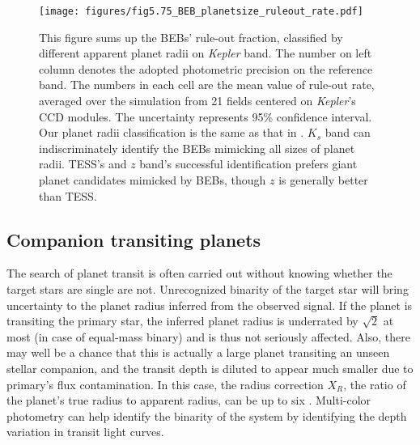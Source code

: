 \documentclass{aastex63}
\begin{document}
	\begin{figure}[ht]
        \centering
        \texttt{[image: figures/fig5.75\_BEB\_planetsize\_ruleout\_rate.pdf]}
        \caption{This figure sums up the BEBs' rule-out fraction, classified by different apparent planet radii on \emph{Kepler} band. The number on left column denotes the adopted photometric precision on the reference band. The numbers in each cell are the mean value of rule-out rate, averaged over the simulation from 21 fields centered on \emph{Kepler}'s CCD modules. The uncertainty represents 95\% confidence interval. Our planet radii classification is the same as that in \cite{Fressin2013}. $K_s$ band can indiscriminately identify the BEBs mimicking all sizes of planet radii. TESS's and $z$ band's successful identification prefers giant planet candidates mimicked by BEBs, though $z$ is generally better than TESS.}
        \label{fig:BEB_plradius_ruleout}
    \end{figure}
    
\subsection{Companion transiting planets}
\label{sec:ctp}

    The search of planet transit is often carried out without knowing whether the target stars are single are not. Unrecognized binarity of the target star will bring uncertainty to the planet radius inferred from the observed signal. If the planet is transiting the primary star, the inferred planet radius is underrated by $\sqrt{2}$ at most (in case of equal-mass binary) and is thus not seriously affected. Also, there may well be a chance that this is actually a large planet transiting an unseen stellar companion, and the transit depth is diluted to appear much smaller due to primary's flux contamination. In this case, the radius correction $X_R$, the ratio of the planet's true radius to apparent radius, can be up to six \citep{Ciardi2015}. Multi-color photometry can help identify the binarity of the system by identifying the depth variation in transit light curves.
\end{document}
